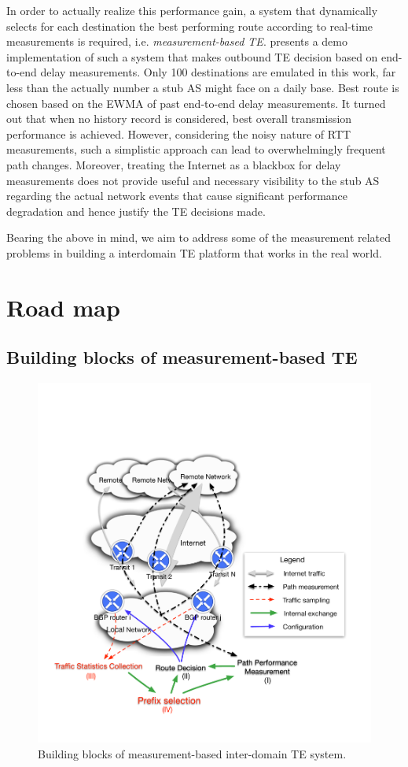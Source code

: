In order to actually realize this performance gain, a system that dynamically selects for each destination the best performing route according to real-time measurements is required, i.e. \textit{measurement-based TE}.
\cite{Akella2008} presents a demo implementation of such a system that makes outbound TE decision based on end-to-end delay measurements. Only 100 destinations are emulated in this work, far less than the actually number a stub AS might face on a daily base. Best route is chosen based on the \acf{EWMA} of past end-to-end delay measurements. It turned out that when no history record is considered, best overall transmission performance is achieved. However, considering the noisy nature of RTT measurements, such a simplistic approach can lead to overwhelmingly frequent path changes. Moreover, treating the Internet as a blackbox for delay measurements does not provide useful and necessary visibility to the stub AS regarding the actual network events that cause significant performance degradation and hence justify the TE decisions made. 


Bearing the above in mind, we aim to address some of the measurement related problems in building a interdomain TE platform that works in the real world.


\section{Road map}
\subsection{Building blocks of measurement-based TE}

\begin{figure}[!htb]
\centering
\includegraphics[width=\textwidth]{gfx/chap1/archi.pdf}
\caption{Building blocks of measurement-based inter-domain TE system.}
\label{fig:archi}
\end{figure}

